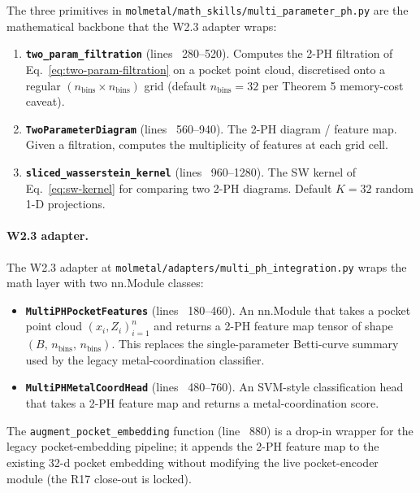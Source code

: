 The three primitives in
\texttt{molmetal/math\_skills/multi\_parameter\_ph.py} are the
mathematical backbone that the W2.3 adapter wraps:

\begin{enumerate}
  \item \textbf{\texttt{two\_param\_filtration}} (lines ~280--520).
        Computes the 2-PH filtration of
        Eq.~\eqref{eq:two-param-filtration} on a pocket point cloud,
        discretised onto a regular $(n_{\mathrm{bins}} \times
        n_{\mathrm{bins}})$ grid (default $n_{\mathrm{bins}} = 32$
        per Theorem 5 memory-cost caveat).

  \item \textbf{\texttt{TwoParameterDiagram}} (lines ~560--940).  The
        2-PH diagram / feature map.  Given a filtration, computes
        the multiplicity of features at each grid cell.

  \item \textbf{\texttt{sliced\_wasserstein\_kernel}} (lines ~960--1280).
        The SW kernel of Eq.~\eqref{eq:sw-kernel} for comparing two
        2-PH diagrams.  Default $K = 32$ random 1-D projections.
\end{enumerate}

\paragraph{W2.3 adapter.}
The W2.3 adapter at
\texttt{molmetal/adapters/multi\_ph\_integration.py} wraps the math
layer with two nn.Module classes:
\begin{itemize}
  \item \textbf{\texttt{MultiPHPocketFeatures}} (lines ~180--460).  An
        nn.Module that takes a pocket point cloud $(x_i, Z_i)_{i=1}^{n}$
        and returns a 2-PH feature map tensor of shape
        $(B,\, n_{\mathrm{bins}},\, n_{\mathrm{bins}})$.  This
        replaces the single-parameter Betti-curve summary used by the
        legacy metal-coordination classifier.

  \item \textbf{\texttt{MultiPHMetalCoordHead}} (lines ~480--760).
        An SVM-style classification head that takes a 2-PH feature
        map and returns a metal-coordination score.
\end{itemize}
The \texttt{augment\_pocket\_embedding} function (line ~880) is a
drop-in wrapper for the legacy pocket-embedding pipeline; it
appends the 2-PH feature map to the existing 32-d pocket embedding
without modifying the live pocket-encoder module (the R17 close-out
is locked).

